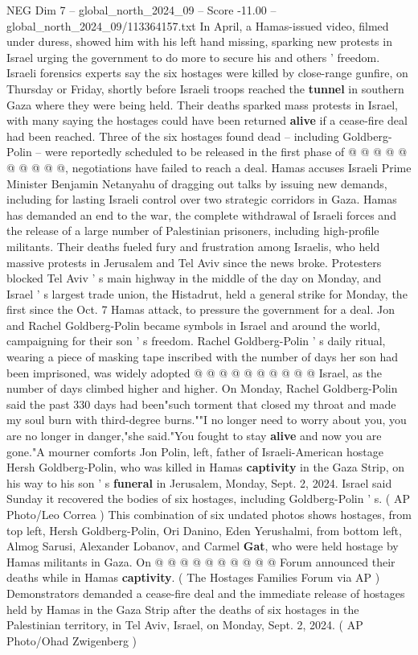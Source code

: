 \begin{textsample}{NEG Dim 7 – global\_north\_2024\_09 – Score -11.00 – global\_north\_2024\_09/113364157.txt}
In April, a Hamas-issued video, filmed under duress, showed him with his left hand missing, sparking new protests in Israel urging the government to do more to secure his and others ' freedom.
Israeli forensics experts say the six hostages were killed by close-range gunfire, on Thursday or Friday, shortly before Israeli troops reached the \textbf{tunnel} in southern Gaza where they were being held.
Their deaths sparked mass protests in Israel, with many saying the hostages could have been returned \textbf{alive} if a cease-fire deal had been reached.
Three of the six hostages found dead -- including Goldberg-Polin -- were reportedly scheduled to be released in the first phase of @ @ @ @ @ @ @ @ @ @, negotiations have failed to reach a deal.
Hamas accuses Israeli Prime Minister Benjamin Netanyahu of dragging out talks by issuing new demands, including for lasting Israeli control over two strategic corridors in Gaza.
Hamas has demanded an end to the war, the complete withdrawal of Israeli forces and the release of a large number of Palestinian prisoners, including high-profile militants.
Their deaths fueled fury and frustration among Israelis, who held massive protests in Jerusalem and Tel Aviv since the news broke.
Protesters blocked Tel Aviv ' s main highway in the middle of the day on Monday, and Israel ' s largest trade union, the Histadrut, held a general strike for Monday, the first since the Oct. 7 Hamas attack, to pressure the government for a deal.
Jon and Rachel Goldberg-Polin became symbols in Israel and around the world, campaigning for their son ' s freedom.
Rachel Goldberg-Polin ' s daily ritual, wearing a piece of masking tape inscribed with the number of days her son had been imprisoned, was widely adopted @ @ @ @ @ @ @ @ @ @ Israel, as the number of days climbed higher and higher.
On Monday, Rachel Goldberg-Polin said the past 330 days had been"such torment that closed my throat and made my soul burn with third-degree burns.""I no longer need to worry about you, you are no longer in danger,"she said."You fought to stay \textbf{alive} and now you are gone."A mourner comforts Jon Polin, left, father of Israeli-American hostage Hersh Goldberg-Polin, who was killed in Hamas \textbf{captivity} in the Gaza Strip, on his way to his son ' s \textbf{funeral} in Jerusalem, Monday, Sept. 2, 2024.
Israel said Sunday it recovered the bodies of six hostages, including Goldberg-Polin ' s. ( AP Photo/Leo Correa ) This combination of six undated photos shows hostages, from top left, Hersh Goldberg-Polin, Ori Danino, Eden Yerushalmi, from bottom left, Almog Sarusi, Alexander Lobanov, and Carmel \textbf{Gat}, who were held hostage by Hamas militants in Gaza.
On @ @ @ @ @ @ @ @ @ @ Forum announced their deaths while in Hamas \textbf{captivity}. ( The Hostages Families Forum via AP ) Demonstrators demanded a cease-fire deal and the immediate release of hostages held by Hamas in the Gaza Strip after the deaths of six hostages in the Palestinian territory, in Tel Aviv, Israel, on Monday, Sept. 2, 2024. ( AP Photo/Ohad Zwigenberg )

\end{textsample}
